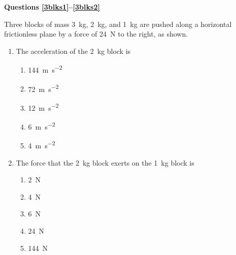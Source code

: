 \documentclass{../../../oss-apphys}
\begin{document}
\begin{multicols}{2}
\begin{enumerate}[resume,leftmargin=18pt]
%    
  \end{enumerate}
  \columnbreak
    
  \textbf{Questions \ref{3blks1}--\ref{3blks2}}

  Three blocks of mass \SI{3}{\kilo\gram}, \SI{2}{\kilo\gram}, and
  \SI{1}{\kilo\gram} are pushed along a horizontal frictionless plane by a
  force of \SI{24}{\newton} to the right, as shown.
  
  \begin{enumerate}[resume,leftmargin=18pt]
  \item The acceleration of the \SI{2}{\kilo\gram} block is
    \begin{enumerate}[nosep,leftmargin=18pt,label=(\Alph*)]
    \item\SI{144}{\metre\per\second\squared}
    \item\SI{72 }{\metre\per\second\squared}
    \item\SI{12 }{\metre\per\second\squared}
    \item\SI{6  }{\metre\per\second\squared}
    \item\SI{4  }{\metre\per\second\squared}
    \end{enumerate}
    \label{3blks1}
    
  \item The force that the \SI{2}{\kilo\gram} block exerts on the
    \SI{1}{\kilo\gram} block is
    \begin{enumerate}[nosep,leftmargin=18pt,label=(\Alph*)]
    \item\SI{2}{\newton}
    \item\SI{4}{\newton}
    \item\SI{6}{\newton}
    \item\SI{24}{\newton}
    \item\SI{144}{\newton}
    \end{enumerate}
    \label{3blks2}
    

\end{enumerate}
\end{multicols}
\end{document}

